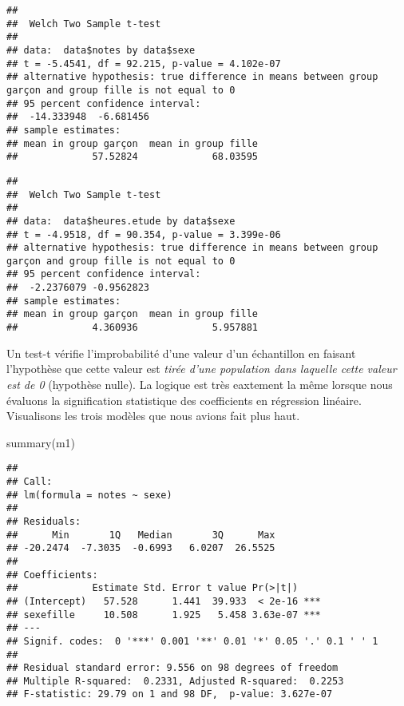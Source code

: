 \documentclass[
]{book}
\newenvironment{Shaded}{\begin{snugshade}}{\end{snugshade}}
\newcommand{\CommentTok}[1]{\textcolor[rgb]{0.56,0.35,0.01}{\textit{#1}}}
\newcommand{\FunctionTok}[1]{\textcolor[rgb]{0.00,0.00,0.00}{#1}}
\newcommand{\NormalTok}[1]{#1}
\newcommand{\SpecialCharTok}[1]{\textcolor[rgb]{0.00,0.00,0.00}{#1}}
\begin{document}
\begin{verbatim}
## 
##  Welch Two Sample t-test
## 
## data:  data$notes by data$sexe
## t = -5.4541, df = 92.215, p-value = 4.102e-07
## alternative hypothesis: true difference in means between group garçon and group fille is not equal to 0
## 95 percent confidence interval:
##  -14.333948  -6.681456
## sample estimates:
## mean in group garçon  mean in group fille 
##             57.52824             68.03595
\end{verbatim}

\begin{Shaded}
\end{Shaded}

\begin{verbatim}
## 
##  Welch Two Sample t-test
## 
## data:  data$heures.etude by data$sexe
## t = -4.9518, df = 90.354, p-value = 3.399e-06
## alternative hypothesis: true difference in means between group garçon and group fille is not equal to 0
## 95 percent confidence interval:
##  -2.2376079 -0.9562823
## sample estimates:
## mean in group garçon  mean in group fille 
##             4.360936             5.957881
\end{verbatim}

Un test-t vérifie l'improbabilité d'une valeur d'un échantillon en faisant l'hypothèse que cette valeur est \emph{tirée d'une population dans laquelle cette valeur est de 0} (hypothèse nulle). La logique est très eaxtement la même lorsque nous évaluons la signification statistique des coefficients en régression linéaire. Visualisons les trois modèles que nous avions fait plus haut.

\begin{Shaded}
\begin{Highlighting}[]
\FunctionTok{summary}\NormalTok{(m1)}
\end{Highlighting}
\end{Shaded}

\begin{verbatim}
## 
## Call:
## lm(formula = notes ~ sexe)
## 
## Residuals:
##      Min       1Q   Median       3Q      Max 
## -20.2474  -7.3035  -0.6993   6.0207  26.5525 
## 
## Coefficients:
##             Estimate Std. Error t value Pr(>|t|)    
## (Intercept)   57.528      1.441  39.933  < 2e-16 ***
## sexefille     10.508      1.925   5.458 3.63e-07 ***
## ---
## Signif. codes:  0 '***' 0.001 '**' 0.01 '*' 0.05 '.' 0.1 ' ' 1
## 
## Residual standard error: 9.556 on 98 degrees of freedom
## Multiple R-squared:  0.2331, Adjusted R-squared:  0.2253 
## F-statistic: 29.79 on 1 and 98 DF,  p-value: 3.627e-07
\end{verbatim}
\end{document}
